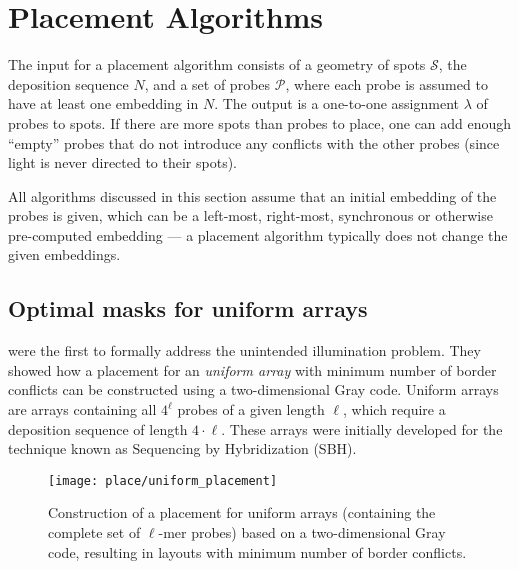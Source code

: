 \chapter{Placement Algorithms}
\label{ch:placement}

The input for a placement algorithm consists of a geometry of spots
$\mathcal{S}$, the deposition sequence $N$, and a set of probes $\mathcal{P}$,
where each probe is assumed to have at least one embedding in $N$. The output is
a one-to-one assignment $\lambda$ of probes to spots. If there are more spots
than probes to place, one can add enough ``empty'' probes that do not introduce
any conflicts with the other probes (since light is never directed to their
spots).

All algorithms discussed in this section assume that an initial embedding of the
probes is given, which can be a left-most, right-most, synchronous or otherwise
pre-computed embedding --- a placement algorithm typically does not change the
given embeddings.

\section{Optimal masks for uniform arrays}
\label{sec:placement_uniform}

\citet{Feldman1994} were the first to formally address the unintended
illumination problem. They showed how a placement for an \emph{uniform array}
with minimum number of border conflicts can be constructed using a
two-dimensional Gray code. Uniform arrays are arrays containing all $4^\ell$
probes of a given length $\ell$, which require a deposition sequence of length
$4\cdot \ell$. These arrays were initially developed for the technique known as
Sequencing by Hybridization (SBH).

\begin{figure}[t]\centering
\texttt{[image: place/uniform\_placement]}
\caption{\label{fig:uniform_placement}%
  Construction of a placement for uniform arrays (containing the complete set of
  $\ell$-mer probes) based on a two-dimensional Gray code, resulting in layouts
  with minimum number of border conflicts.}
\end{figure}

